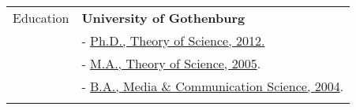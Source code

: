 \documentclass[a4paper,11pt,oneside]{article}
\begin{document}

\noindent \begin{tabular}{@{} l l}
 \Large{Education}    & \textbf{University of Gothenburg} \\
     & - \href{http://files.christopherkullenberg.se/doctoraldegreeonline.pdf}{Ph.D., Theory of Science, 2012.} \\
     & - \href{http://files.christopherkullenberg.se/examengrundutbildningonline.pdf}{M.A., Theory of Science, 2005}. \\
     & - \href{http://files.christopherkullenberg.se/examengrundutbildningonline.pdf}{B.A., Media \& Communication Science, 2004}. \\
     & \\


\end{tabular}
\end{document}
